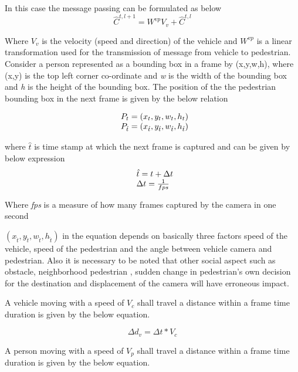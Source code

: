 In this case the message passing can be formulated as below 
\begin{equation}
\hat{C}^{t, l+1}={W}^{vp}V_v +  \hat{C}^{t, l}
\end{equation}

Where $V_v$ is the velocity (speed and direction) of the vehicle and ${W}^{vp}$ is a linear transformation used for the transmission of message from vehicle to pedestrian.
Consider a person represented as a bounding box in a frame by (x,y,w,h), where (x,y) is the top left corner co-ordinate and \textit{w} is the width of the bounding box and \textit{h} is the height of the bounding box. The position of the the pedestrian bounding box in the next frame is given by the below relation

\begin{equation}
\begin{array}{l@{}}
{P}_{t}=(x_t,y_t,w_t,h_t) \\
{P}_{\hat{t}}=(x_{\hat{t}},y_{\hat{t}},w_{\hat{t}},h_{\hat{t}})
\end{array}
\end{equation}

where $\hat{t}$ is time stamp at which the next frame is captured and can be given by below expression
\begin{equation}
\begin{array}{l@{}}
\hat{t} = t +  \Delta t \\
\Delta t = \frac{1}{fps}
\end{array}
\end{equation}

Where \textit{fps} is a measure of how many frames captured by the camera in one second

$(x_{\hat{t}},y_{\hat{t}},w_{\hat{t}},h_{\hat{t}})$ in the equation depends on basically three factors speed of the vehicle, speed of the pedestrian and the angle between vehicle camera and pedestrian. Also it is necessary to be noted that other social aspect such as obstacle, neighborhood pedestrian  , sudden change in pedestrian's own decision for the destination and displacement of the camera will have erroneous impact.

A vehicle moving with a speed of $V_c$ shall travel a distance within a frame time duration is given by the below equation.

\begin{equation}
\Delta d_v = \Delta t * V_c
\end{equation}

A person moving with a speed of $V_p$ shall travel a distance within a frame time duration is given by the below equation.

